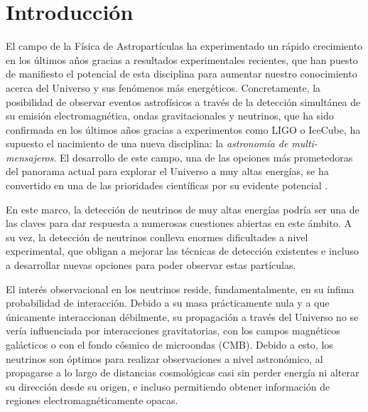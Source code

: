 \documentclass[12 pt, a4paper]{article} %
\numberwithin{equation}{section}
\numberwithin{figure}{section}
\numberwithin{table}{section}
\begin{document}
	\section{Introducción}\label{sec1}
	El campo de la Física de Astropartículas ha experimentado un rápido crecimiento en los últimos años gracias a resultados experimentales recientes, que han puesto de manifiesto el potencial de esta disciplina para aumentar nuestro conocimiento acerca del Universo y sus fenómenos más energéticos. Concretamente, la posibilidad de observar eventos astrofísicos a través de la detección simultánea de su emisión electromagnética, ondas gravitacionales y neutrinos, que ha sido confirmada en los últimos años gracias a experimentos como LIGO o IceCube, ha supuesto el nacimiento de una nueva disciplina: la \textit{astronomía de multi-mensajeros}. El desarrollo de este campo, una de las opciones más prometedoras del panorama actual para explorar el Universo a muy altas energías, se ha convertido en una de las prioridades científicas por su evidente potencial \cite{neronov2019introduction}.
	
	En este marco, la detección de neutrinos de muy altas energías podría ser una de las claves para dar respuesta a numerosas cuestiones abiertas en este ámbito. A su vez, la detección de neutrinos conlleva enormes dificultades a nivel experimental, que obligan a mejorar las técnicas de detección existentes e incluso a desarrollar nuevas opciones para poder observar estas partículas.
	
	El interés observacional en los neutrinos reside, fundamentalmente, en su ínfima probabilidad de interacción. Debido a su masa prácticamente nula y a que únicamente interaccionan débilmente, su propagación a través del Universo no se vería influenciada por interacciones gravitatorias, con los campos magnéticos galácticos o con el fondo cósmico de microondas (CMB). Debido a esto, los neutrinos son óptimos para realizar observaciones a nivel astronómico, al propagarse a lo largo de distancias cosmológicas casi sin perder energía ni alterar su dirección desde su origen, e incluso permitiendo obtener información de regiones electromagnéticamente opacas.
	
\end{document}
